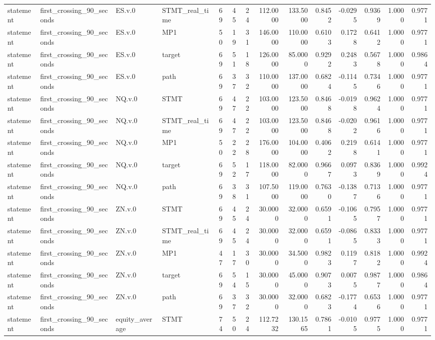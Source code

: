 \begin{tabular}{llllrrrrrrrrrr}
statement & first_crossing_90_seconds & ES.v.0 & STMT_real_time & 69 & 45 & 24 & 112.0000 & 133.5000 & 0.8452 & -0.0295 & 0.9369 & 1.0000 & 0.9771 \\
statement & first_crossing_90_seconds & ES.v.0 & MP1 & 50 & 19 & 31 & 146.0000 & 110.0000 & 0.6103 & 0.1728 & 0.6412 & 1.0000 & 0.9771 \\
statement & first_crossing_90_seconds & ES.v.0 & target & 69 & 51 & 18 & 126.0000 & 85.0000 & 0.9292 & 0.2483 & 0.5678 & 1.0000 & 0.9864 \\
statement & first_crossing_90_seconds & ES.v.0 & path & 69 & 37 & 32 & 110.0000 & 137.0000 & 0.6824 & -0.1145 & 0.7346 & 1.0000 & 0.9771 \\
statement & first_crossing_90_seconds & NQ.v.0 & STMT & 69 & 47 & 22 & 103.0000 & 123.5000 & 0.8468 & -0.0198 & 0.9624 & 1.0000 & 0.9771 \\
statement & first_crossing_90_seconds & NQ.v.0 & STMT_real_time & 69 & 47 & 22 & 103.0000 & 123.5000 & 0.8468 & -0.0202 & 0.9616 & 1.0000 & 0.9771 \\
statement & first_crossing_90_seconds & NQ.v.0 & MP1 & 50 & 22 & 28 & 176.0000 & 104.0000 & 0.4062 & 0.2198 & 0.6141 & 1.0000 & 0.9771 \\
statement & first_crossing_90_seconds & NQ.v.0 & target & 69 & 52 & 17 & 118.0000 & 82.0000 & 0.9667 & 0.0973 & 0.8369 & 1.0000 & 0.9924 \\
statement & first_crossing_90_seconds & NQ.v.0 & path & 69 & 38 & 31 & 107.5000 & 119.0000 & 0.7630 & -0.1387 & 0.7136 & 1.0000 & 0.9771 \\
statement & first_crossing_90_seconds & ZN.v.0 & STMT & 69 & 45 & 24 & 30.0000 & 32.0000 & 0.6591 & -0.1065 & 0.7957 & 1.0000 & 0.9771 \\
statement & first_crossing_90_seconds & ZN.v.0 & STMT_real_time & 69 & 45 & 24 & 30.0000 & 32.0000 & 0.6591 & -0.0865 & 0.8333 & 1.0000 & 0.9771 \\
statement & first_crossing_90_seconds & ZN.v.0 & MP1 & 47 & 17 & 30 & 30.0000 & 34.5000 & 0.9823 & 0.1197 & 0.8182 & 1.0000 & 0.9924 \\
statement & first_crossing_90_seconds & ZN.v.0 & target & 69 & 54 & 15 & 30.0000 & 45.0000 & 0.9073 & 0.0075 & 0.9877 & 1.0000 & 0.9864 \\
statement & first_crossing_90_seconds & ZN.v.0 & path & 69 & 37 & 32 & 30.0000 & 32.0000 & 0.6823 & -0.1774 & 0.6536 & 1.0000 & 0.9771 \\
statement & first_crossing_90_seconds & equity_average & STMT & 74 & 50 & 24 & 112.7232 & 130.1565 & 0.7861 & -0.0105 & 0.9775 & 1.0000 & 0.9771 \\

\end{tabular}
